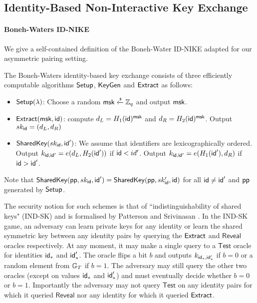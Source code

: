 \subsection{Identity-Based Non-Interactive Key Exchange} \label{sec:idnike}

	\paragraph{Boneh-Waters ID-NIKE} We give a self-contained definition of the Boneh-Water ID-NIKE \cite{boneh2013constrained} adapted for our asymmetric pairing setting.
	
	\begin{definition}
		The Boneh-Waters identity-based key exchange consists of three efficiently computable algorithms $\mathsf{Setup}$, $\mathsf{KeyGen}$ and $\mathsf{Extract}$ as follows:
		\begin{itemize}
			\item $\mathsf{Setup}(\lambda)$: Choose a random $\mathsf{msk} \xleftarrow{\scriptscriptstyle \$} \mathbb{Z}_q$ and output $\mathsf{msk}$.
			\item $\mathsf{Extract}(\mathsf{msk}, \mathsf{id})$: compute $d_L = H_1(\mathsf{id})^{\mathsf{msk}}$ and $d_R = H_2(\mathsf{id})^{\mathsf{msk}}$. Output $sk_{\mathsf{id}} = (d_L, d_R)$
			\item $\mathsf{SharedKey}(sk_{\mathsf{id}}, \mathsf{id}')$: We assume that identifiers are lexicographically ordered. Output $k_{\mathsf{id}, \mathsf{id}'} = e(d_L, H_2(\mathsf{id}'))$ if $\mathsf{id} < id'$. Output $k_{\mathsf{id}, \mathsf{id}'} = e(H_1(\mathsf{id}'), d_R)$ if $\mathsf{id} > \mathsf{id}'$.
		\end{itemize}
		Note that $\mathsf{SharedKey}(\mathsf{pp}, sk_{\mathsf{id}}, \mathsf{id}') = \mathsf{SharedKey}(\mathsf{pp}, sk_{\mathsf{id}}', \mathsf{id})$ for all $\mathsf{id} \neq \mathsf{id}'$ and $\mathsf{pp}$ generated by $\mathsf{Setup}$.
	\end{definition}

	The security notion for such schemes is that of ``indistinguishability of shared keys" (IND-SK) and is formalised by Patterson and Srivinasan \cite{cryptoeprint:2007/453}.
	In the IND-SK game, an adversary can learn private keys for any identity or learn the shared symmetric key between any identity pairs by querying the $\mathsf{Extract}$ and $\mathsf{Reveal}$ oracles respectively.
	At any moment, it may make a single query to a $\mathsf{Test}$ oracle for identities $\mathsf{id}_*$ and $\mathsf{id}'_*$.
	The oracle flips a bit $b$ and outputs $k_{\mathsf{id}_*, \mathsf{id}'_*}$ if $b = 0$ or a random element from $\mathbb{G}_T$ if $b=1$.
	The adversary may still query the other two oracles (except on values $\mathsf{id}_*$ and $\mathsf{id}'_*$) and must eventually decide whether $b=0$ or $b=1$.
	Importantly the adversary may not query $\mathsf{Test}$ on any identity pairs for which it queried $\mathsf{Reveal}$ nor any identity for which it queried $\mathsf{Extract}$.

